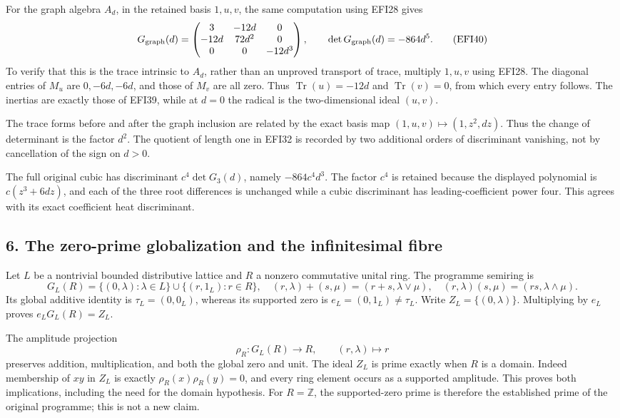 \documentclass[
  10pt,
  a4paper,
]{article}
\begin{document}
For the graph algebra \(A_d\), in the retained basis \(1,u,v\), the same
computation using EFI28 gives \[
G_{\rm graph}(d)=
\begin{pmatrix}
3&-12d&0\\-12d&72d^2&0\\0&0&-12d^3
\end{pmatrix},
\qquad \det G_{\rm graph}(d)=-864d^5.
\tag{EFI40}
\] To verify that this is the trace intrinsic to \(A_d\), rather than an
unproved transport of trace, multiply \(1,u,v\) using EFI28. The
diagonal entries of \(M_u\) are \(0,-6d,-6d\), and those of \(M_v\) are
all zero. Thus \(\operatorname{Tr}(u)=-12d\) and
\(\operatorname{Tr}(v)=0\), from which every entry follows. The inertias
are exactly those of EFI39, while at \(d=0\) the radical is the
two-dimensional ideal \((u,v)\).

The trace forms before and after the graph inclusion are related by the
exact basis map \((1,u,v)\mapsto(1,z^2,dz)\). Thus the change of
determinant is the factor \(d^2\). The quotient of length one in EFI32
is recorded by two additional orders of discriminant vanishing, not by
cancellation of the sign on \(d>0\).

The full original cubic has discriminant \(c^4\det G_3(d)\), namely
\(-864c^4d^3\). The factor \(c^4\) is retained because the displayed
polynomial is \(c(z^3+6dz)\), and each of the three root differences is
unchanged while a cubic discriminant has leading-coefficient power four.
This agrees with its exact coefficient heat discriminant.

\subsection{6. The zero-prime globalization and the infinitesimal
fibre}\label{the-zero-prime-globalization-and-the-infinitesimal-fibre}

Let \(L\) be a nontrivial bounded distributive lattice and \(R\) a
nonzero commutative unital ring. The programme semiring is \[
G_L(R)=\{(0,\lambda):\lambda\in L\}
\cup\{(r,1_L):r\in R\},
\quad
(r,\lambda)+(s,\mu)=(r+s,\lambda\vee\mu),
\quad
(r,\lambda)(s,\mu)=(rs,\lambda\wedge\mu).
\tag{EFI41}
\] Its global additive identity is \(\tau_L=(0,0_L)\), whereas its
supported zero is \(e_L=(0,1_L)\ne\tau_L\). Write
\(Z_L=\{(0,\lambda)\}\). Multiplying by \(e_L\) proves
\(e_LG_L(R)=Z_L\).

The amplitude projection \[
\rho_R:G_L(R)\longrightarrow R,\qquad (r,\lambda)\longmapsto r
\tag{EFI42}
\] preserves addition, multiplication, and both the global zero and
unit. The ideal \(Z_L\) is prime exactly when \(R\) is a domain. Indeed
membership of \(xy\) in \(Z_L\) is exactly \(\rho_R(x)\rho_R(y)=0\), and
every ring element occurs as a supported amplitude. This proves both
implications, including the need for the domain hypothesis. For
\(R=\mathbb Z\), the supported-zero prime is therefore the established
prime of the original programme; this is not a new claim.
\end{document}
